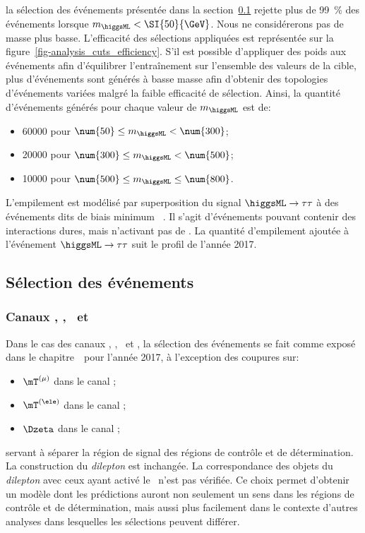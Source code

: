 la sélection des événements présentée dans la section~\ref{chapter-ML-section-evt_gen-selection} rejette plus de \SI{99}{\%} des événements lorsque $m_{\higgsML} < \SI{50}{\GeV}$.
Nous ne considérerons pas de masse plus basse.
L'efficacité des sélections appliquées est représentée sur la figure~\ref{fig-analysis_cuts_efficiency}.
S'il est possible d'appliquer des poids aux événements afin d'équilibrer l'entraînement sur l'ensemble des valeurs de la cible,
plus d'événements sont générés à basse masse afin d'obtenir des topologies d'événements variées malgré la faible efficacité de sélection.
Ainsi, la quantité d'événements générés pour chaque valeur de $m_{\higgsML}$ est de:
\begin{itemize}
\item \num{60000} pour $ \num{50} \leq m_{\higgsML} < \num{300} $;
\item \num{20000} pour $ \num{300} \leq m_{\higgsML} < \num{500} $;
\item \num{10000} pour $ \num{500} \leq m_{\higgsML} \leq \num{800}$.
\end{itemize}
\par
L'empilement est modélisé par superposition du signal $\higgsML\to\tau\tau$ à des événements dits de \og biais minimum \fg~\cite{pythia8.2}.
Il s'agit d'événements pouvant contenir des interactions dures, mais n'activant pas de \HLTpath.
La quantité d'empilement ajoutée à l'événement $\higgsML\to\tau\tau$ suit le profil de l'année 2017.
\newpage
\subsection{Sélection des événements}\label{chapter-ML-section-evt_gen-selection}
\subsubsection{Canaux \tauh\tauh, \mu\tauh, \ele\tauh\ et \ele\mu}
Dans le cas des canaux
\tauh\tauh, \mu\tauh, \ele\tauh\ et \ele\mu,
la sélection des événements se fait comme exposé dans le chapitre~\ pour l'année 2017,
à l'exception des coupures sur:
\begin{itemize}
\item $\mT^{(\mu)}$ dans le canal \mu\tauh;
\item $\mT^{(\ele)}$ dans le canal \ele\tauh;
\item $\Dzeta$ dans le canal \ele\mu;
\end{itemize}
servant à séparer la région de signal des régions de contrôle et de détermination.
La construction du \emph{dilepton} est inchangée.
La correspondance des objets du \emph{dilepton} avec ceux ayant activé le \HLTpath\ n'est pas vérifiée.
Ce choix permet d'obtenir un modèle dont les prédictions auront non seulement un sens dans les régions de contrôle et de détermination, mais aussi plus facilement dans le contexte d'autres analyses dans lesquelles les sélections peuvent différer.
\renewcommand{\IfMoreOnePair}{Si plus d'une paire possible existe dans l'événement, une seule est retenue selon la logique exposée dans le chapitre~\refChHTT.}
